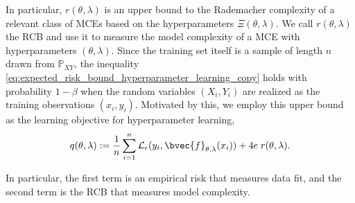 \documentclass{llncs}
\begin{document}
	In particular, $r(\theta, \lambda)$ is an upper bound to the Rademacher complexity of a relevant class of \glspl{MCE} based on the hyperparameters $\Xi(\theta, \lambda)$. We call $r(\theta, \lambda)$ the \gls{RCB} and use it to measure the model complexity of a \gls{MCE} with hyperparameters $(\theta, \lambda)$. Since the training set itself is a sample of length $n$ drawn from $\mathbb{P}_{X Y}$, the inequality \eqref{eq:expected_risk_bound_hyperparameter_learning_copy} holds with probability $1 - \beta$ when the random variables $(X_{i}, Y_{i})$ are realized as the training observations $(x_{i}, y_{i})$. Motivated by this, we employ this upper bound as the learning objective for hyperparameter learning,
	\begin{equation}
	q(\theta, \lambda) := \frac{1}{n} \sum_{i = 1}^{n} \mathcal{L}_{\epsilon}(y_{i}, \bvec{f}_{\theta, \lambda}(x_{i})) + 4 e \; r(\theta, \lambda).
	\label{eq:learning_objective}
	\end{equation}
	
	In particular, the first term is an empirical risk that measures data fit, and the second term is the \gls{RCB} that measures model complexity.
	
\end{document}
